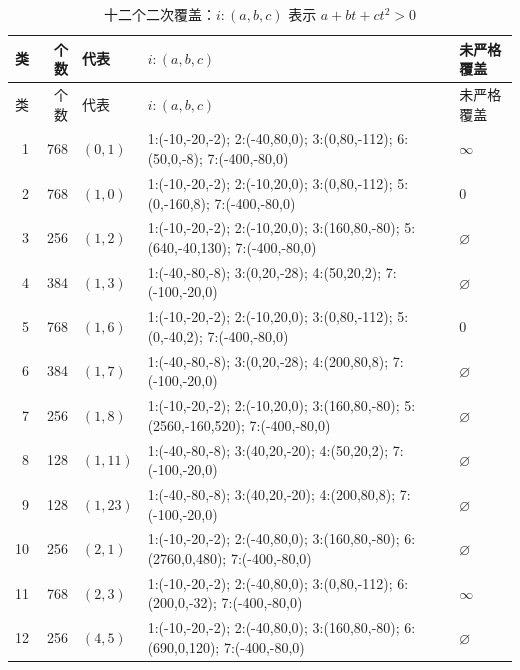 \begingroup\small
\begin{longtable}{r r l p{83mm} p{24mm}}
\caption{十二个二次覆盖：$i:(a,b,c)$ 表示 $a+bt+ct^2>0$}\label{tab:ten-data}\\
\toprule 类&个数&代表&$i:(a,b,c)$&未严格覆盖\\\midrule\endfirsthead
\toprule 类&个数&代表&$i:(a,b,c)$&未严格覆盖\\\midrule\endhead
1&768&$(0,1)$&1:(-10,-20,-2); 2:(-40,80,0); 3:(0,80,-112); 6:(50,0,-8); 7:(-400,-80,0)&$\infty$\\
2&768&$(1,0)$&1:(-10,-20,-2); 2:(-10,20,0); 3:(0,80,-112); 5:(0,-160,8); 7:(-400,-80,0)&0\\
3&256&$(1,2)$&1:(-10,-20,-2); 2:(-10,20,0); 3:(160,80,-80); 5:(640,-40,130); 7:(-400,-80,0)&$\varnothing$\\
4&384&$(1,3)$&1:(-40,-80,-8); 3:(0,20,-28); 4:(50,20,2); 7:(-100,-20,0)&$\varnothing$\\
5&768&$(1,6)$&1:(-10,-20,-2); 2:(-10,20,0); 3:(0,80,-112); 5:(0,-40,2); 7:(-400,-80,0)&0\\
6&384&$(1,7)$&1:(-40,-80,-8); 3:(0,20,-28); 4:(200,80,8); 7:(-100,-20,0)&$\varnothing$\\
7&256&$(1,8)$&1:(-10,-20,-2); 2:(-10,20,0); 3:(160,80,-80); 5:(2560,-160,520); 7:(-400,-80,0)&$\varnothing$\\
8&128&$(1,11)$&1:(-40,-80,-8); 3:(40,20,-20); 4:(50,20,2); 7:(-100,-20,0)&$\varnothing$\\
9&128&$(1,23)$&1:(-40,-80,-8); 3:(40,20,-20); 4:(200,80,8); 7:(-100,-20,0)&$\varnothing$\\
10&256&$(2,1)$&1:(-10,-20,-2); 2:(-40,80,0); 3:(160,80,-80); 6:(2760,0,480); 7:(-400,-80,0)&$\varnothing$\\
11&768&$(2,3)$&1:(-10,-20,-2); 2:(-40,80,0); 3:(0,80,-112); 6:(200,0,-32); 7:(-400,-80,0)&$\infty$\\
12&256&$(4,5)$&1:(-10,-20,-2); 2:(-40,80,0); 3:(160,80,-80); 6:(690,0,120); 7:(-400,-80,0)&$\varnothing$\\
\bottomrule\end{longtable}
\endgroup

